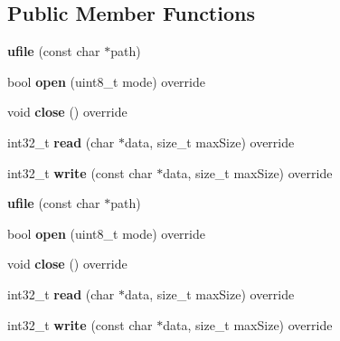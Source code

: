 \subsection*{Public Member Functions}
\begin{DoxyCompactItemize}
\item 
{\bfseries ufile} (const char $\ast$path)\hypertarget{classgxx_1_1io_1_1ufile_af08a1e19860c47c97e0425b48fc35dc8}{}\label{classgxx_1_1io_1_1ufile_af08a1e19860c47c97e0425b48fc35dc8}

\item 
bool {\bfseries open} (uint8\+\_\+t mode) override\hypertarget{classgxx_1_1io_1_1ufile_a273312c761c75e9665795025d5f9d1f0}{}\label{classgxx_1_1io_1_1ufile_a273312c761c75e9665795025d5f9d1f0}

\item 
void {\bfseries close} () override\hypertarget{classgxx_1_1io_1_1ufile_ae01e500b6b16373a70e8cdc6102eead4}{}\label{classgxx_1_1io_1_1ufile_ae01e500b6b16373a70e8cdc6102eead4}

\item 
int32\+\_\+t {\bfseries read} (char $\ast$data, size\+\_\+t max\+Size) override\hypertarget{classgxx_1_1io_1_1ufile_a53a4ca3f253bfba44d377b4795393662}{}\label{classgxx_1_1io_1_1ufile_a53a4ca3f253bfba44d377b4795393662}

\item 
int32\+\_\+t {\bfseries write} (const char $\ast$data, size\+\_\+t max\+Size) override\hypertarget{classgxx_1_1io_1_1ufile_a02d3f46d78315ac5ab275a97c36221af}{}\label{classgxx_1_1io_1_1ufile_a02d3f46d78315ac5ab275a97c36221af}

\item 
{\bfseries ufile} (const char $\ast$path)\hypertarget{classgxx_1_1io_1_1ufile_af08a1e19860c47c97e0425b48fc35dc8}{}\label{classgxx_1_1io_1_1ufile_af08a1e19860c47c97e0425b48fc35dc8}

\item 
bool {\bfseries open} (uint8\+\_\+t mode) override\hypertarget{classgxx_1_1io_1_1ufile_a273312c761c75e9665795025d5f9d1f0}{}\label{classgxx_1_1io_1_1ufile_a273312c761c75e9665795025d5f9d1f0}

\item 
void {\bfseries close} () override\hypertarget{classgxx_1_1io_1_1ufile_ae01e500b6b16373a70e8cdc6102eead4}{}\label{classgxx_1_1io_1_1ufile_ae01e500b6b16373a70e8cdc6102eead4}

\item 
int32\+\_\+t {\bfseries read} (char $\ast$data, size\+\_\+t max\+Size) override\hypertarget{classgxx_1_1io_1_1ufile_a53a4ca3f253bfba44d377b4795393662}{}\label{classgxx_1_1io_1_1ufile_a53a4ca3f253bfba44d377b4795393662}

\item 
int32\+\_\+t {\bfseries write} (const char $\ast$data, size\+\_\+t max\+Size) override\hypertarget{classgxx_1_1io_1_1ufile_a02d3f46d78315ac5ab275a97c36221af}{}\label{classgxx_1_1io_1_1ufile_a02d3f46d78315ac5ab275a97c36221af}

\end{DoxyCompactItemize}
